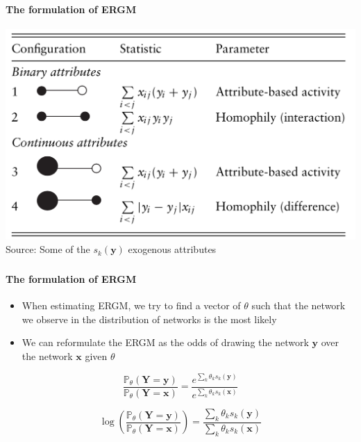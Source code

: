 \documentclass[8pt]{beamer}
\begin{document}


\begin{frame}
\frametitle{\insertsection}
\framesubtitle{The formulation of ERGM}

\centering
\includegraphics[height=0.5\textheight]{homophily}\\
\tiny{Source: Some of the $s_k(\mathbf{y})$ exogenous attributes \cite{Lusher2012}}

\end{frame}


\begin{frame}
\frametitle{\insertsection}
\framesubtitle{The formulation of ERGM}

\begin{itemize}
	\item When estimating ERGM, we try to find a vector of $\theta$ such that the network we observe in the distribution of networks is the most likely
	\item We can reformulate the ERGM as the odds of drawing the network $\mathbf{y}$ over the network $\mathbf{x}$ given $\theta$

\end{itemize}

\begin{equation*}
\frac{\mathbb{P}_\theta({\mathbf{Y} = \mathbf{y}})}{\mathbb{P}_\theta({\mathbf{Y} = \mathbf{x}})} = \frac{e^{\sum_k \theta_k s_k(\mathbf{y})}}{e^{\sum_k \theta_k s_k(\mathbf{x})}}
\end{equation*}

\begin{equation*}
\log\left(\frac{\mathbb{P}_\theta({\mathbf{Y} = \mathbf{y}})}{\mathbb{P}_\theta({\mathbf{Y} = \mathbf{x}})}\right) = \frac{\sum_k \theta_k s_k(\mathbf{y})}{\sum_k \theta_k s_k(\mathbf{x})}
\end{equation*}

\end{frame}
\end{document}

